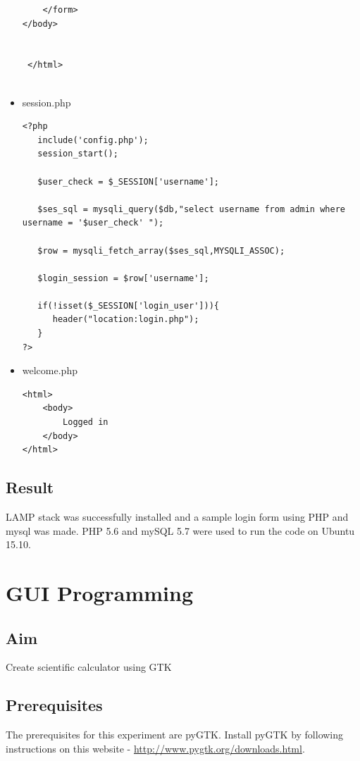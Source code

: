\documentclass{article}
\begin{document}
\begin{itemize}
\begin{verbatim}
	</form>
</body>


 </html>
 
\end{verbatim}

\item session.php

\begin{verbatim}
<?php
   include('config.php');
   session_start();
   
   $user_check = $_SESSION['username'];
   
   $ses_sql = mysqli_query($db,"select username from admin where username = '$user_check' ");
   
   $row = mysqli_fetch_array($ses_sql,MYSQLI_ASSOC);
   
   $login_session = $row['username'];
   
   if(!isset($_SESSION['login_user'])){
      header("location:login.php");
   }
?>
\end{verbatim}

\item welcome.php

\begin{verbatim}
<html>
	<body>
		Logged in
	</body>
</html>
\end{verbatim}

\end{itemize}
\subsection{Result}
LAMP stack was successfully installed and a sample login form using PHP and mysql was made. PHP 5.6 and mySQL 5.7 were used to run the code on Ubuntu 15.10.

\begin{refsection}
\cite{lamp}
\printbibliography
\end{refsection}


\newpage
\section{GUI Programming}

\subsection{Aim}
 Create scientific calculator using GTK

 \subsection{Prerequisites} 
 The prerequisites for this experiment are pyGTK. Install pyGTK by following instructions on this website - \url{http://www.pygtk.org/downloads.html}.
\end{document}
